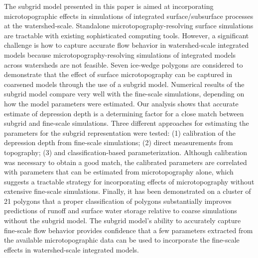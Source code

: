 \documentclass[review,11pt]{elsarticle}
\begin{document}
The subgrid model presented in this paper is aimed at incorporating microtopographic effects in simulations of integrated surface/subsurface processes at the watershed-scale.
Standalone microtopography-resolving surface simulations are tractable with existing sophisticated computing tools.
However, a significant challenge is how to capture accurate flow behavior in watershed-scale integrated models because microtopography-resolving simulations of integrated models across watersheds are not feasible.
Seven ice-wedge polygons are considered to demonstrate that the effect of surface microtopography can be captured in coarsened models through the use of a subgrid model.
Numerical results of the subgrid model compare very well with the fine-scale simulations, depending on how the model parameters were estimated.
Our analysis shows that accurate estimate of depression depth is a determining factor for a close match between subgrid and fine-scale simulations.
Three different approaches for estimating the parameters for the subgrid representation were tested: (1) calibration of the depression depth from fine-scale simulations; (2) direct measurements from topography; (3) and classification-based parameterization.
Although calibration was necessary to obtain a good match, the calibrated parameters are correlated with parameters that can be estimated from microtopography alone, which suggests a tractable strategy for incorporating effects of microtopography without extensive fine-scale simulations. 
Finally, it has been demonstrated on a cluster of 21 polygons that a proper classification of polygons substantially improves predictions of runoff and surface water storage relative to coarse simulations without the subgrid model.
The subgrid model's ability to accurately capture fine-scale flow behavior provides confidence that a few parameters extracted from the available microtopographic data can be used to incorporate the fine-scale effects in watershed-scale integrated models.
\end{document}
